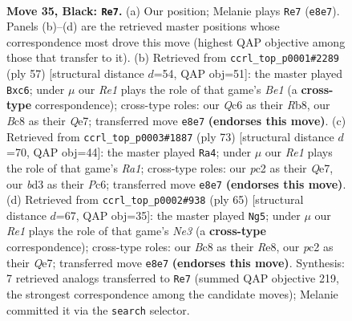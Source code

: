 \documentclass[11pt]{article}
\begin{document}
\clearpage

\begin{figure}[p]\centering
\begin{subfigure}{0.46\textwidth}\centering
\resizebox{\linewidth}{!}{%
\newchessgame
\chessboard[
  setfen={2b1r1k1/5p1p/2q3p1/2n1PpN1/p4P2/3B4/PQP2KPP/6R1 b - - 7 35},
  showmover=false,
  pgfstyle=straightmove, color=movearrow, markmove={e8-e7}
]}
\caption{}
\end{subfigure}\hfill
\begin{subfigure}{0.46\textwidth}\centering
\resizebox{\linewidth}{!}{%
\newchessgame
\chessboard[
  setfen={1r2b1k1/4qp2/2Pp2p1/1p2p1np/1P2P3/2PB2NP/3Q1PP1/R5K1 b - - 0 29},
  showmover=false,
  pgfstyle=straightmove, color=movearrow, markmove={e8-c6}
]}
\caption{}
\end{subfigure}
\\[4pt]
\begin{subfigure}{0.46\textwidth}\centering
\resizebox{\linewidth}{!}{%
\newchessgame
\chessboard[
  setfen={r5k1/1p2qpp1/2p1bn1p/8/4PN1P/P1Q3P1/1B3P2/4R1K1 b - - 0 37},
  showmover=false,
  pgfstyle=straightmove, color=movearrow, markmove={a8-a4}
]}
\caption{}
\end{subfigure}\hfill
\begin{subfigure}{0.46\textwidth}\centering
\resizebox{\linewidth}{!}{%
\newchessgame
\chessboard[
  setfen={4r3/3bqpk1/1Np1n1p1/3p4/3P3p/3BP2P/1Q3PP1/R5K1 b - - 0 33},
  showmover=false,
  pgfstyle=straightmove, color=movearrow, markmove={e6-g5}
]}
\caption{}
\end{subfigure}
\caption{\textbf{Move 35, Black: \texttt{Re7}.} (a) Our position; Melanie plays \texttt{Re7} (\texttt{e8e7}). Panels (b)--(d) are the retrieved master positions whose correspondence most drove this move (highest QAP objective among those that transfer to it). (b) Retrieved from \texttt{ccrl\_top\_p0001\#2289} (ply 57) [structural distance $d$=54, QAP obj=51]: the master played \texttt{Bxc6}; under $\mu$ our \emph{Re1} plays the role of that game's \emph{Be1} (a \textbf{cross-type} correspondence); cross-type roles: our \emph{Q}c6 as their \emph{R}b8, our \emph{B}c8 as their \emph{Q}e7; transferred move \texttt{e8e7} \textbf{(endorses this move)}. (c) Retrieved from \texttt{ccrl\_top\_p0003\#1887} (ply 73) [structural distance $d$=70, QAP obj=44]: the master played \texttt{Ra4}; under $\mu$ our \emph{Re1} plays the role of that game's \emph{Ra1}; cross-type roles: our \emph{p}c2 as their \emph{Q}e7, our \emph{b}d3 as their \emph{P}c6; transferred move \texttt{e8e7} \textbf{(endorses this move)}. (d) Retrieved from \texttt{ccrl\_top\_p0002\#938} (ply 65) [structural distance $d$=67, QAP obj=35]: the master played \texttt{Ng5}; under $\mu$ our \emph{Re1} plays the role of that game's \emph{Ne3} (a \textbf{cross-type} correspondence); cross-type roles: our \emph{B}c8 as their \emph{R}e8, our \emph{p}c2 as their \emph{Q}e7; transferred move \texttt{e8e7} \textbf{(endorses this move)}. Synthesis: 7 retrieved analogs transferred to \texttt{Re7} (summed QAP objective 219, the strongest correspondence among the candidate moves); Melanie committed it via the \texttt{search} selector.}
\label{fig:thought-m69}
\end{figure}
\end{document}
